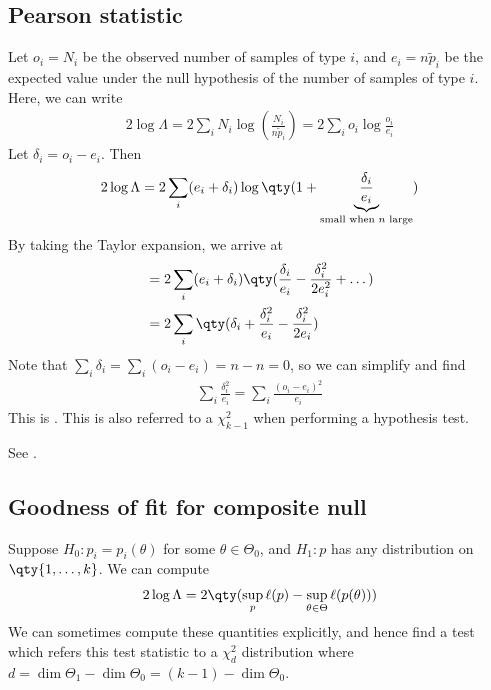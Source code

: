 \subsection{Pearson statistic}
Let $o_i = N_i$ be the observed number of samples of type $i$, and $e_i = n \widetilde p_i$ be the expected value under the null hypothesis of the number of samples of type $i$.
Here, we can write
\begin{align*}
	2 \log \Lambda = 2 \sum_i N_i \log(\frac{N_i}{n \widetilde p_i}) = 2 \sum_i o_i \log \frac{o_i}{e_i}
\end{align*}
Let $\delta_i = o_i - e_i$.
Then
\begin{align*}
	2 \log \Lambda = 2 \sum_i (e_i + \delta_i) \log\qty(1 + \underbrace{\frac{\delta_i}{e_i}}_{\text{small when } n \text{ large}})
\end{align*}
By taking the Taylor expansion, we arrive at
\begin{align*}
	&= 2 \sum_i (e_i + \delta_i) \qty(\frac{\delta_i}{e_i} - \frac{\delta^2_i}{2e^2_i} + \dots) \\
	&= 2 \sum_i \qty(\delta_i + \frac{\delta_i^2}{e_i} - \frac{\delta_i^2}{2e_i})
\end{align*}
Note that $\sum_i \delta_i = \sum_i (o_i - e_i) = n - n = 0$, so we can simplify and find
\begin{align*}
	\sum_i \frac{\delta_i^2}{e_i} = \sum_i \frac{(o_i - e_i)^2}{e_i}
\end{align*}
This is .
This is also referred to a $\chi^2_{k-1}$ when performing a hypothesis test.

\begin{example}
	See .
\end{example} 

\subsection{Goodness of fit for composite null}
Suppose $H_0 \colon p_i = p_i(\theta)$ for some $\theta \in \Theta_0$, and $H_1 \colon p$ has any distribution on $\qty{1, \dots, k}$.
We can compute
\begin{align*}
	2 \log \Lambda = 2 \qty( \sup_p \ell(p) - \sup_{\theta \in \Theta} \ell(p(\theta)) )
\end{align*}
We can sometimes compute these quantities explicitly, and hence find a test which refers this test statistic to a $\chi^2_d$ distribution where $d = \dim \Theta_1 - \dim \Theta_0 = (k-1) - \dim \Theta_0$.

